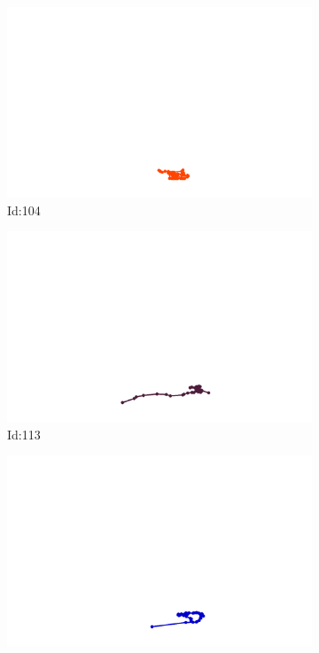 \documentclass[12pt,twoside]{report}
\begin{document}
\begin{figure}
\centering
\begin{subfigure}[b]{0.20\textwidth}
\centering
\includegraphics[width=\textwidth]{../../trajectories/104.png}
\caption{Id:104}
\end{subfigure}
\begin{subfigure}[b]{0.20\textwidth}
\centering
\includegraphics[width=\textwidth]{../../trajectories/113.png}
\caption{Id:113}
\end{subfigure}
\begin{subfigure}[b]{0.20\textwidth}
\centering
\includegraphics[width=\textwidth]{../../trajectories/130.png}

\end{subfigure}
\end{figure}
\end{document}
